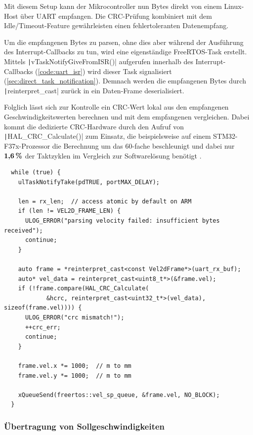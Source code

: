 Mit diesem Setup kann der Mikrocontroller nun Bytes direkt von einem Linux-Host
über UART empfangen. Die CRC-Prüfung kombiniert mit dem Idle/Timeout-Feature
gewährleisten einen fehlertoleranten Datenempfang.

Um die empfangenen Bytes zu parsen, ohne dies aber während der Ausführung des
Interrupt-Callbacks zu tun, wird eine eigenständige FreeRTOS-Task erstellt.
Mittels \texttt|vTaskNotifyGiveFromISR()| aufgerufen innerhalb des
Interrupt-Callbacks (\ref{code:uart_isr}) wird dieser Task signalisiert
(\ref{sec:direct_task_notification}). Demnach werden die empfangenen Bytes durch
\texttt|reinterpret_cast| zurück in ein Daten-Frame deserialisiert.

Folglich lässt sich zur Kontrolle ein CRC-Wert lokal aus den empfangenen
Geschwindigkeitswerten berechnen und mit dem empfangenen vergleichen. Dabei
kommt die dedizierte CRC-Hardware durch den Aufruf von
\texttt|HAL_CRC_Calculate()| zum Einsatz, die beispielsweise auf einem
STM32-F37x-Prozessor die Berechnung um das 60-fache beschleunigt und dabei nur
$\textbf{1,6\,\%}$ der Taktzyklen im Vergleich zur Softwarelösung benötigt
\cite[S. 9]{AN4187}.

\begin{code}
\begin{verbatim}
  while (true) {
    ulTaskNotifyTake(pdTRUE, portMAX_DELAY);

    len = rx_len;  // access atomic by default on ARM
    if (len != VEL2D_FRAME_LEN) {
      ULOG_ERROR("parsing velocity failed: insufficient bytes received");
      continue;
    }

    auto frame = *reinterpret_cast<const Vel2dFrame*>(uart_rx_buf);
    auto* vel_data = reinterpret_cast<uint8_t*>(&frame.vel);
    if (!frame.compare(HAL_CRC_Calculate(
            &hcrc, reinterpret_cast<uint32_t*>(vel_data), sizeof(frame.vel)))) {
      ULOG_ERROR("crc mismatch!");
      ++crc_err;
      continue;
    }

    frame.vel.x *= 1000;  // m to mm
    frame.vel.y *= 1000;  // m to mm

    xQueueSend(freertos::vel_sp_queue, &frame.vel, NO_BLOCK);
  }
\end{verbatim}
\end{code}

\subsubsection{Übertragung von Sollgeschwindigkeiten}

